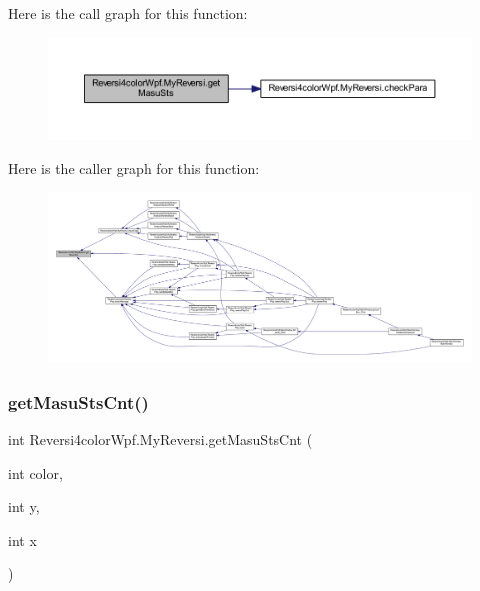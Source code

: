 Here is the call graph for this function\+:
\nopagebreak
\begin{figure}[H]
\begin{center}
\leavevmode
\includegraphics[width=350pt]{class_reversi4color_wpf_1_1_my_reversi_a4e1068b67037558148ae886c6d3ef6d8_cgraph}
\end{center}
\end{figure}
Here is the caller graph for this function\+:
\nopagebreak
\begin{figure}[H]
\begin{center}
\leavevmode
\includegraphics[width=350pt]{class_reversi4color_wpf_1_1_my_reversi_a4e1068b67037558148ae886c6d3ef6d8_icgraph}
\end{center}
\end{figure}
\mbox{\label{class_reversi4color_wpf_1_1_my_reversi_aa335ecfdefbc46bca8de76b2865a4654}} 
\subsubsection{\texorpdfstring{get\+Masu\+Sts\+Cnt()}{getMasuStsCnt()}}
{\footnotesize\ttfamily int Reversi4color\+Wpf.\+My\+Reversi.\+get\+Masu\+Sts\+Cnt (\begin{DoxyParamCaption}\item[{int}]{color,  }\item[{int}]{y,  }\item[{int}]{x }\end{DoxyParamCaption})}



